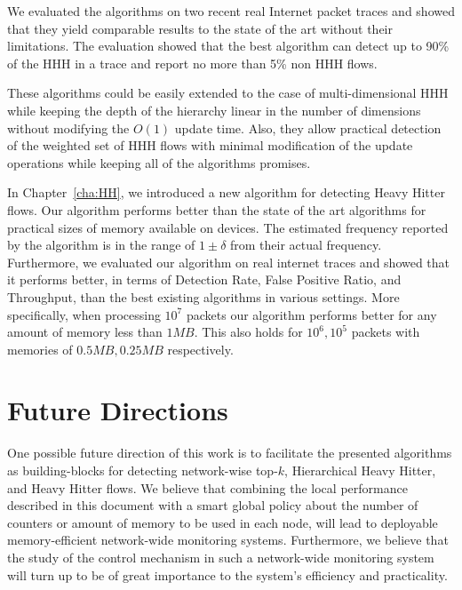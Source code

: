We evaluated the algorithms on two recent real Internet packet traces and showed that they yield comparable results to the state of the art without their limitations. The evaluation showed that the best algorithm can detect up to 90\% of the HHH in a trace and report no more than 5\% non HHH flows.

These algorithms could be easily extended to the case of multi-dimensional HHH while keeping the depth of the hierarchy linear in the number of dimensions without modifying the $O(1)$ update time. Also, they allow practical detection of the weighted set of HHH flows with minimal modification of the update operations while keeping all of the algorithms promises.

In Chapter~\ref{cha:HH}, we introduced a new algorithm for detecting Heavy Hitter flows. Our algorithm performs better than the state of the art algorithms for practical sizes of memory available on devices. The estimated frequency reported by the algorithm is in the range of $1\pm \delta$ from their actual frequency. Furthermore, we evaluated our algorithm on real internet traces and showed that it performs better, in terms of Detection Rate, False Positive Ratio, and Throughput, than the best existing algorithms in various settings. More specifically, when processing $10^7$ packets our algorithm performs better for any amount of memory less than $1MB$. This also holds for $10^6, 10^5$ packets with memories of $0.5MB, 0.25MB$ respectively.

\section*{Future Directions}

One possible future direction of this work is to facilitate the presented algorithms as building-blocks for detecting network-wise top-$k$, Hierarchical Heavy Hitter, and Heavy Hitter flows. We believe that combining the local performance described in this document with a smart global policy about the number of counters or amount of memory to be used in each node, will lead to deployable memory-efficient network-wide monitoring systems. Furthermore, we believe that the study of the control mechanism in such a network-wide monitoring system will turn up to be of great importance to the system's efficiency and practicality.
